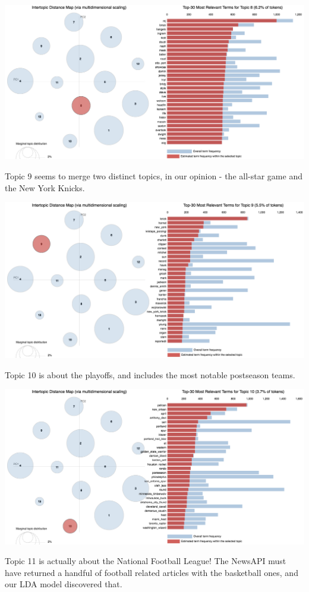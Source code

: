 \documentclass[11pt]{article}
\begin{document}
\includegraphics[width=470pt]{8.png} 

Topic 9 seems to merge two distinct topics, in our opinion - the all-star game and the New York Knicks. 

\includegraphics[width=470pt]{9.png} 

Topic 10 is about the playoffs, and includes the most notable postseason teams. 

\includegraphics[width=470pt]{10.png} 

Topic 11 is actually about the National Football League!  The NewsAPI must have returned a handful of football related articles with the basketball ones, and our LDA model discovered that. 
\end{document}
